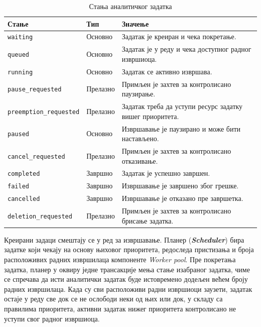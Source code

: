\documentclass[12pt,oneside]{memoir}
\begin{document}
\begin{table}[htbp]
\centering
\caption{Стања аналитичког задатка}
\label{tab:analytical-task-states}
\begin{tabular}{|l|l|p{}|}

\hline
\textbf{Стање} & \textbf{Тип} & \textbf{Значење} \\

\hline
\texttt{waiting} & Основно & Задатак је креиран и чека покретање. \\

\hline
\texttt{queued} & Основно & Задатак је у реду и чека доступног радног извршиоца. \\

\hline
\texttt{running} & Основно & Задатак се активно извршава. \\

\hline
\texttt{pause\_requested} & Прелазно & Примљен је захтев за контролисано паузирање. \\

\hline
\texttt{preemption\_requested} & Прелазно & Задатак треба да уступи ресурс задатку вишег приоритета. \\

\hline
\texttt{paused} & Основно & Извршавање је паузирано и може бити настављено. \\

\hline
\texttt{cancel\_requested} & Прелазно & Примљен је захтев за контролисано отказивање. \\

\hline
\texttt{completed} & Завршно & Задатак је успешно завршен. \\

\hline
\texttt{failed} & Завршно & Извршавање је завршено због грешке. \\

\hline
\texttt{cancelled} & Завршно & Извршавање је отказано пре завршетка. \\

\hline
\texttt{deletion\_requested} & Прелазно & Примљен је захтев за контролисано брисање задатка. \\

\hline
\end{tabular}
\end{table}

Креирани задаци смештају се у ред за извршавање. Планер (\textit{\textbf{Scheduler}}) бира задатке који чекају на основу њиховог приоритета, редоследа пристизања и броја расположивих радних извршилаца компоненте \textit{Worker pool}. Пре покретања задатка, планер у оквиру једне трансакције мења стање изабраног задатка, чиме се спречава да исти аналитички задатак буде истовремено додељен већем броју радних извршилаца. Када су сви расположиви радни извршиоци заузети, задатак остаје у реду све док се не ослободи неки од њих или док, у складу са правилима приоритета, активни задатак нижег приоритета контролисано не уступи свог радног извршиоца.
\end{document}
